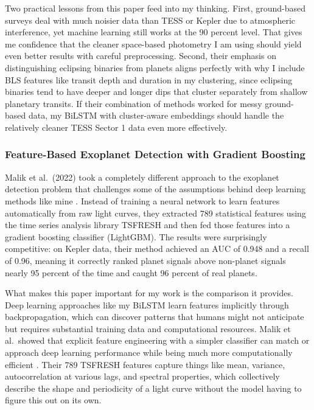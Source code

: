 \documentclass[letterpaper]{article} %
\begin{document}
Two practical lessons from this paper feed into my thinking. First, ground-based surveys deal with much noisier data than TESS or Kepler due to atmospheric interference, yet machine learning still works at the 90 percent level. That gives me confidence that the cleaner space-based photometry I am using should yield even better results with careful preprocessing. Second, their emphasis on distinguishing eclipsing binaries from planets aligns perfectly with why I include BLS features like transit depth and duration in my clustering, since eclipsing binaries tend to have deeper and longer dips that cluster separately from shallow planetary transits. If their combination of methods worked for messy ground-based data, my BiLSTM with cluster-aware embeddings should handle the relatively cleaner TESS Sector 1 data even more effectively.

\subsubsection{Feature-Based Exoplanet Detection with Gradient Boosting}
Malik et al.\ (2022) took a completely different approach to the exoplanet detection problem that challenges some of the assumptions behind deep learning methods like mine \cite{Malik2022exoplanetdetection}. Instead of training a neural network to learn features automatically from raw light curves, they extracted 789 statistical features using the time series analysis library TSFRESH and then fed those features into a gradient boosting classifier (LightGBM). The results were surprisingly competitive: on Kepler data, their method achieved an AUC of 0.948 and a recall of 0.96, meaning it correctly ranked planet signals above non-planet signals nearly 95 percent of the time and caught 96 percent of real planets.

What makes this paper important for my work is the comparison it provides. Deep learning approaches like my BiLSTM learn features implicitly through backpropagation, which can discover patterns that humans might not anticipate but requires substantial training data and computational resources. Malik et al.\ showed that explicit feature engineering with a simpler classifier can match or approach deep learning performance while being much more computationally efficient \cite{Malik2022exoplanetdetection}. Their 789 TSFRESH features capture things like mean, variance, autocorrelation at various lags, and spectral properties, which collectively describe the shape and periodicity of a light curve without the model having to figure this out on its own.
\end{document}
